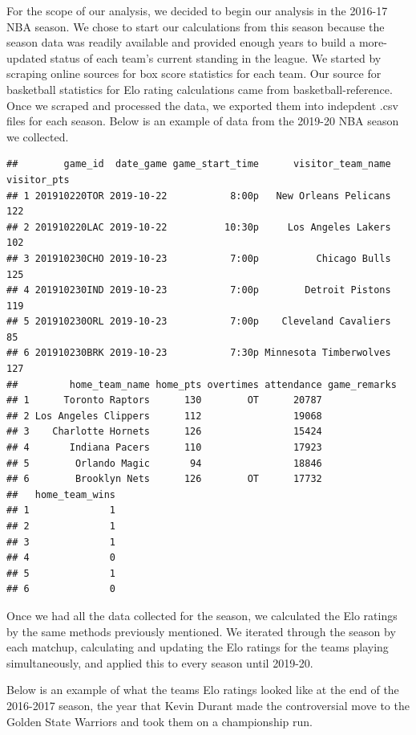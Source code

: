 \documentclass[]{article}
\begin{document}
For the scope of our analysis, we decided to begin our analysis in the
2016-17 NBA season. We chose to start our calculations from this season
because the season data was readily available and provided enough years
to build a more-updated status of each team's current standing in the
league. We started by scraping online sources for box score statistics
for each team. Our source for basketball statistics for Elo rating
calculations came from basketball-reference. Once we scraped and
processed the data, we exported them into indepdent .csv files for each
season. Below is an example of data from the 2019-20 NBA season we
collected.

\begin{verbatim}
##        game_id  date_game game_start_time      visitor_team_name visitor_pts
## 1 201910220TOR 2019-10-22           8:00p   New Orleans Pelicans         122
## 2 201910220LAC 2019-10-22          10:30p     Los Angeles Lakers         102
## 3 201910230CHO 2019-10-23           7:00p          Chicago Bulls         125
## 4 201910230IND 2019-10-23           7:00p        Detroit Pistons         119
## 5 201910230ORL 2019-10-23           7:00p    Cleveland Cavaliers          85
## 6 201910230BRK 2019-10-23           7:30p Minnesota Timberwolves         127
##         home_team_name home_pts overtimes attendance game_remarks
## 1      Toronto Raptors      130        OT      20787             
## 2 Los Angeles Clippers      112                19068             
## 3    Charlotte Hornets      126                15424             
## 4       Indiana Pacers      110                17923             
## 5        Orlando Magic       94                18846             
## 6        Brooklyn Nets      126        OT      17732             
##   home_team_wins
## 1              1
## 2              1
## 3              1
## 4              0
## 5              1
## 6              0
\end{verbatim}

Once we had all the data collected for the season, we calculated the Elo
ratings by the same methods previously mentioned. We iterated through
the season by each matchup, calculating and updating the Elo ratings for
the teams playing simultaneously, and applied this to every season until
2019-20.

Below is an example of what the teams Elo ratings looked like at the end
of the 2016-2017 season, the year that Kevin Durant made the
controversial move to the Golden State Warriors and took them on a
championship run.
\end{document}
